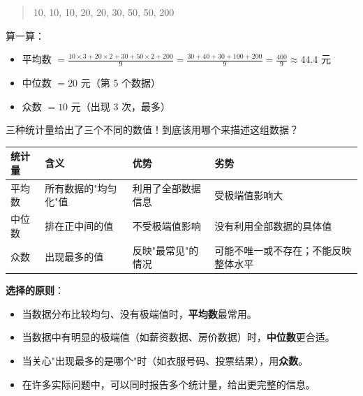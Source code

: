 \begin{quote}
10, 10, 10, 20, 20, 30, 50, 50, 200
\end{quote}


算一算：
\begin{itemize}
  \item 平均数 $= \frac{10 \times 3 + 20 \times 2 + 30 + 50 \times 2 + 200}{9} = \frac{30 + 40 + 30 + 100 + 200}{9} = \frac{400}{9} \approx 44.4$ 元
  \item 中位数 $= 20$ 元（第 5 个数据）
  \item 众数 $= 10$ 元（出现 3 次，最多）
\end{itemize}


三种统计量给出了三个不同的数值！到底该用哪个来描述这组数据？

\begin{understand}


\begin{center}
\begin{tabular}{llll}
\toprule
统计量 & 含义 & 优势 & 劣势 \\
\midrule
平均数 & 所有数据的"均匀化"值 & 利用了全部数据信息 & 受极端值影响大 \\
中位数 & 排在正中间的值 & 不受极端值影响 & 没有利用全部数据的具体值 \\
众数 & 出现最多的值 & 反映"最常见"的情况 & 可能不唯一或不存在；不能反映整体水平 \\
\bottomrule
\end{tabular}
\end{center}


\textbf{选择的原则}：

\begin{itemize}
  \item 当数据分布比较均匀、没有极端值时，\textbf{平均数}最常用。
  \item 当数据中有明显的极端值（如薪资数据、房价数据）时，\textbf{中位数}更合适。
  \item 当关心"出现最多的是哪个"时（如衣服号码、投票结果），用\textbf{众数}。
  \item 在许多实际问题中，可以同时报告多个统计量，给出更完整的信息。
\end{itemize}


\end{understand}

